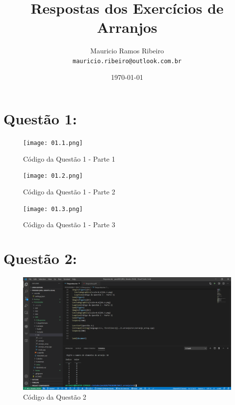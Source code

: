 \documentclass{article}
\author{
  Mauricio Ramos Ribeiro\\
  \texttt{mauricio.ribeiro@outlook.com.br}
}
\title{Respostas dos Exercícios de Arranjos}
\date{\today}
\begin{document}
\maketitle

\vspace{15mm}


\section*{Questão 1:}

\begin{figure}[h!]
  \texttt{[image: 01.1.png]}
  \caption{Código da Questão 1 - Parte 1}
\end{figure}
\begin{figure}[h!]
\texttt{[image: 01.2.png]}
\caption{Código da Questão 1 - Parte 2}
\end{figure}
\begin{figure}[h!]
\texttt{[image: 01.3.png]}
\caption{Código da Questão 1 - Parte 3}
\end{figure}
\vspace{15mm}

\section*{Questão 2:}

\begin{figure}[h!]
  \includegraphics[scale=0.42]{Arr01.png}
  \caption{Código da Questão 2}
  \end{figure}
\vspace{15mm}
\end{document}
